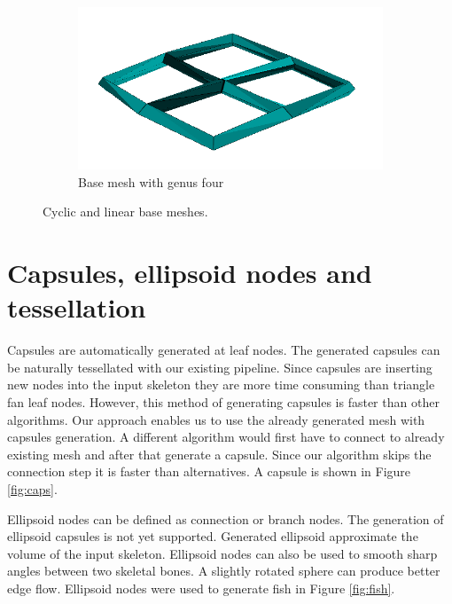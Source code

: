 \begin{figure}[h]
        \begin{subfigure}[b]{0.5\textwidth}
                \includegraphics[width=\textwidth]{images/cycle_mesh.png}
                \caption{Base mesh with genus four}
                \label{fig:cyclic_mesh}
        \end{subfigure}
        \caption[Cyclic and linear base meshes]{Cyclic and linear base meshes.}\label{fig:pavuk}
\end{figure}

\section{Capsules, ellipsoid nodes and tessellation}

Capsules are automatically generated at leaf nodes.
The generated capsules can be naturally tessellated with our existing pipeline.
Since capsules are inserting new nodes into the input skeleton they are more time consuming than triangle fan leaf nodes.
However, this method of generating capsules is faster than other algorithms.
Our approach enables us to use the already generated mesh with capsules generation.
A different algorithm would first have to connect to already existing mesh and after that generate a capsule.
Since our algorithm skips the connection step it is faster than alternatives.
A capsule is shown in Figure \ref{fig:caps}.

Ellipsoid nodes can be defined as connection or branch nodes.
The generation of ellipsoid capsules is not yet supported.
Generated ellipsoid approximate the volume of the input skeleton.
Ellipsoid nodes can also be used to smooth sharp angles between two skeletal bones.
A slightly rotated sphere can produce better edge flow.
Ellipsoid nodes were used to generate fish in Figure \ref{fig:fish}.


